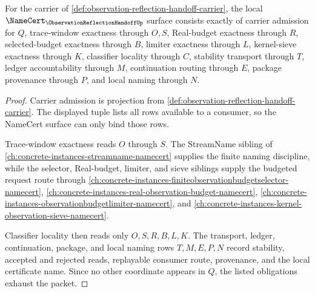 \begin{theorem}
\label{thm:observation-reflection-handoff-namecert-obligations}
For the carrier of \autoref{def:observation-reflection-handoff-carrier}, the local $\NameCert_{\ObservationReflectionHandoffUp}$ surface consists exactly of carrier admission for $Q$, trace-window exactness through $O,S$, Real-budget exactness through $R$, selected-budget exactness through $B$, limiter exactness through $L$, kernel-sieve exactness through $K$, classifier locality through $C$, stability transport through $T$, ledger accountability through $M$, continuation routing through $E$, package provenance through $P$, and local naming through $N$.
\end{theorem}
\begin{proof}
Carrier admission is projection from \autoref{def:observation-reflection-handoff-carrier}. The displayed tuple lists all rows available to a consumer, so the NameCert surface can only bind those rows.

Trace-window exactness reads $O$ through $S$. The StreamName sibling of \autoref{ch:concrete-instances-streamname-namecert} supplies the finite naming discipline, while the selector, Real-budget, limiter, and sieve siblings supply the budgeted request route through \autoref{ch:concrete-instances-finiteobservationbudgetselector-namecert}, \autoref{ch:concrete-instances-real-observation-budget-namecert}, \autoref{ch:concrete-instances-observationbudgetlimiter-namecert}, and \autoref{ch:concrete-instances-kernel-observation-sieve-namecert}.

Classifier locality then reads only $O,S,R,B,L,K$. The transport, ledger, continuation, package, and local naming rows $T,M,E,P,N$ record stability, accepted and rejected reads, replayable consumer route, provenance, and the local certificate name. Since no other coordinate appears in $Q$, the listed obligations exhaust the packet.
\end{proof}

